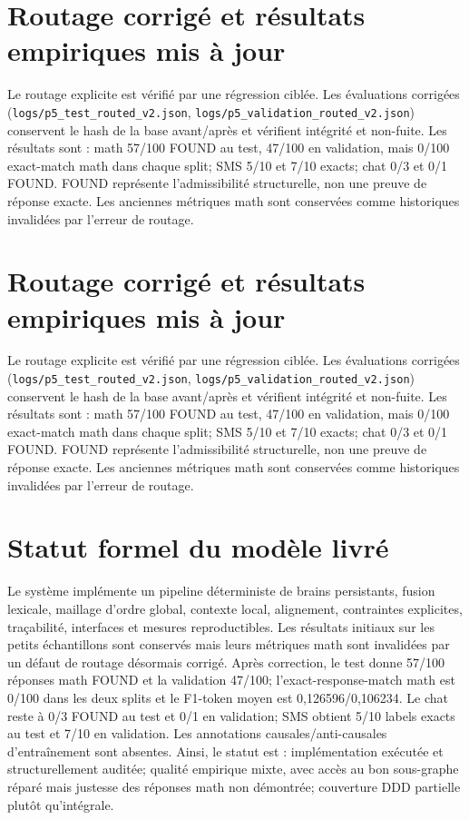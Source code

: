 \documentclass[11pt,a4paper,openany]{book}
\begin{document}
\chapter{Routage corrigé et résultats empiriques mis à jour}
Le routage explicite est vérifié par une régression ciblée. Les évaluations corrigées (\texttt{logs/p5\_test\_routed\_v2.json}, \texttt{logs/p5\_validation\_routed\_v2.json}) conservent le hash de la base avant/après et vérifient intégrité et non-fuite. Les résultats sont : math 57/100 FOUND au test, 47/100 en validation, mais 0/100 exact-match math dans chaque split; SMS 5/10 et 7/10 exacts; chat 0/3 et 0/1 FOUND. FOUND représente l'admissibilité structurelle, non une preuve de réponse exacte. Les anciennes métriques math sont conservées comme historiques invalidées par l'erreur de routage.

\chapter{Routage corrigé et résultats empiriques mis à jour}
Le routage explicite est vérifié par une régression ciblée. Les évaluations corrigées (\texttt{logs/p5\_test\_routed\_v2.json}, \texttt{logs/p5\_validation\_routed\_v2.json}) conservent le hash de la base avant/après et vérifient intégrité et non-fuite. Les résultats sont : math 57/100 FOUND au test, 47/100 en validation, mais 0/100 exact-match math dans chaque split; SMS 5/10 et 7/10 exacts; chat 0/3 et 0/1 FOUND. FOUND représente l'admissibilité structurelle, non une preuve de réponse exacte. Les anciennes métriques math sont conservées comme historiques invalidées par l'erreur de routage.

\chapter{Statut formel du modèle livré}
Le système implémente un pipeline déterministe de brains persistants, fusion lexicale, maillage d'ordre global, contexte local, alignement, contraintes explicites, traçabilité, interfaces et mesures reproductibles. Les résultats initiaux sur les petits échantillons sont conservés mais leurs métriques math sont invalidées par un défaut de routage désormais corrigé. Après correction, le test donne 57/100 réponses math FOUND et la validation 47/100; l'exact-response-match math est 0/100 dans les deux splits et le F1-token moyen est 0,126596/0,106234. Le chat reste à 0/3 FOUND au test et 0/1 en validation; SMS obtient 5/10 labels exacts au test et 7/10 en validation. Les annotations causales/anti-causales d'entraînement sont absentes. Ainsi, le statut est : implémentation exécutée et structurellement auditée; qualité empirique mixte, avec accès au bon sous-graphe réparé mais justesse des réponses math non démontrée; couverture DDD partielle plutôt qu'intégrale.
\end{document}
